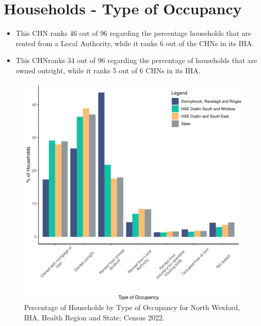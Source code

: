 \documentclass{article}
\begin{document}
\section{Households - Type of Occupancy}\label{sect:Households}
\begin{itemize}
\item This CHN ranks  46 out of 96 regarding the percentage households that are rented from a Local Authority, while it ranks  6 out of the CHNs in its IHA. 
\item This CHNranks  34 out of 96 regarding the percentage of households that are owned outright, while it ranks   5 out of 6 CHNs in its IHA.
\end{itemize}
\begin{figure}[H]
	\centering
	\includegraphics[width = 140mm]{../figures/HouseholdsED.pdf}
	\caption{Percentage of Households by Type of Occupancy for North Wexford, IHA, Health Region and State; Census 2022.}
	\label{fig:vbnv}
	\end{figure}
\end{document}
